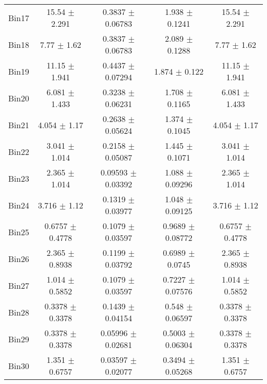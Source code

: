 \begin{tabular}{@{\extracolsep{4pt}}lcccc@{}}
     Bin17 & 15.54 $\pm$ 2.291 & 0.3837 $\pm$ 0.06783 & 1.938 $\pm$ 0.1241 & 15.54 $\pm$ 2.291 \\ 
     Bin18 & 7.77 $\pm$ 1.62 & 0.3837 $\pm$ 0.06783 & 2.089 $\pm$ 0.1288 & 7.77 $\pm$ 1.62 \\ 
     Bin19 & 11.15 $\pm$ 1.941 & 0.4437 $\pm$ 0.07294 & 1.874 $\pm$ 0.122 & 11.15 $\pm$ 1.941 \\ 
     Bin20 & 6.081 $\pm$ 1.433 & 0.3238 $\pm$ 0.06231 & 1.708 $\pm$ 0.1165 & 6.081 $\pm$ 1.433 \\ 
     Bin21 & 4.054 $\pm$ 1.17 & 0.2638 $\pm$ 0.05624 & 1.374 $\pm$ 0.1045 & 4.054 $\pm$ 1.17 \\ 
     Bin22 & 3.041 $\pm$ 1.014 & 0.2158 $\pm$ 0.05087 & 1.445 $\pm$ 0.1071 & 3.041 $\pm$ 1.014 \\ 
     Bin23 & 2.365 $\pm$ 1.014 & 0.09593 $\pm$ 0.03392 & 1.088 $\pm$ 0.09296 & 2.365 $\pm$ 1.014 \\ 
     Bin24 & 3.716 $\pm$ 1.12 & 0.1319 $\pm$ 0.03977 & 1.048 $\pm$ 0.09125 & 3.716 $\pm$ 1.12 \\ 
     Bin25 & 0.6757 $\pm$ 0.4778 & 0.1079 $\pm$ 0.03597 & 0.9689 $\pm$ 0.08772 & 0.6757 $\pm$ 0.4778 \\ 
     Bin26 & 2.365 $\pm$ 0.8938 & 0.1199 $\pm$ 0.03792 & 0.6989 $\pm$ 0.0745 & 2.365 $\pm$ 0.8938 \\ 
     Bin27 & 1.014 $\pm$ 0.5852 & 0.1079 $\pm$ 0.03597 & 0.7227 $\pm$ 0.07576 & 1.014 $\pm$ 0.5852 \\ 
     Bin28 & 0.3378 $\pm$ 0.3378 & 0.1439 $\pm$ 0.04154 & 0.548 $\pm$ 0.06597 & 0.3378 $\pm$ 0.3378 \\ 
     Bin29 & 0.3378 $\pm$ 0.3378 & 0.05996 $\pm$ 0.02681 & 0.5003 $\pm$ 0.06304 & 0.3378 $\pm$ 0.3378 \\ 
     Bin30 & 1.351 $\pm$ 0.6757 & 0.03597 $\pm$ 0.02077 & 0.3494 $\pm$ 0.05268 & 1.351 $\pm$ 0.6757 \\ 
\hline\hline
  \end{tabular}
